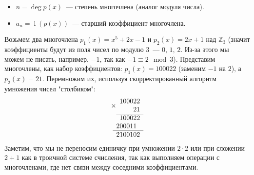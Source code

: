 \documentclass[russian]{lecture-notes}
\theoremstyle{definition}
\DeclareMathOperator{\Lid}{l}
\newcommand{\lid}[1]{\Lid(#1)}
\begin{document}
    \begin{itemize}
        \item $n=\deg{p(x)}$~--- степень многочлена (аналог модуля числа).
        \item $a_n = \lid{p(x)}$~--- старший коэффициент многочлена.
    \end{itemize}

    \begin{example}
        Возьмем два многочлена $p_1(x) = x^5 + 2x - 1$ и $p_2(x) = 2x + 1$ над $\mathbb{Z}_3$ (значит коэффициенты будут из поля чисел по модулю $3$~--- $0$, $1$, $2$. Из-за этого мы можем не писать, например, $-1$, так как $-1 \equiv 2 \mod 3$). Представим многочлены, как набор коэффициентов: $p_1(x) = 100022$ (заменим $-1$ на $2$), а $p_2(x) = 21$. Перемножим их, используя скорректированный алгоритм умножения чисел "столбиком":
        \[
            \begin{array}{r}
                \times
                \begin{array}{r}
                    100022 \\
                    21 \\
                    \hline
                \end{array} \\
                \begin{array}{r}
                    100022 \\
                    200011\phantom{0} \\
                    \hline
                    2100102
                \end{array}
            \end{array}
        \]
        Заметим, что мы не переносим единичку при умножении $2 \cdot 2$ или при сложении $2 + 1$ как в троичной системе счисления, так как выполняем операции с многочленами, где нет связи между соседними коэффициентами.


\end{example}
\end{document}
